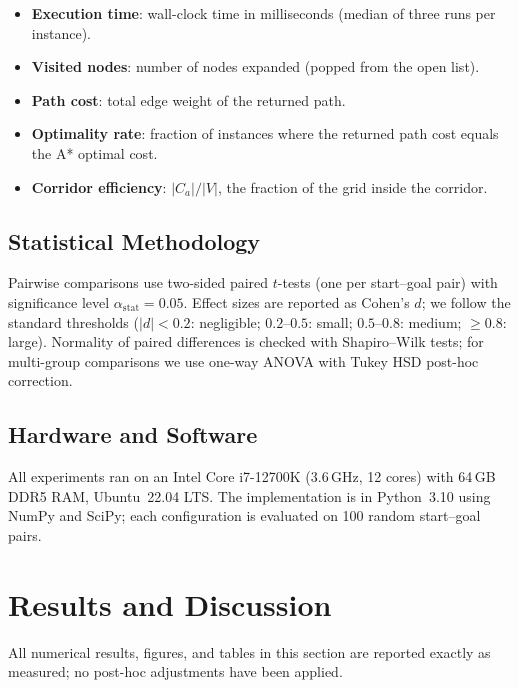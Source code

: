 \documentclass[journal]{IEEEtran}
\begin{document}
\begin{itemize}
    \item \textbf{Execution time}: wall-clock time in milliseconds (median of three runs per instance).
    \item \textbf{Visited nodes}: number of nodes expanded (popped from the open list).
    \item \textbf{Path cost}: total edge weight of the returned path.
    \item \textbf{Optimality rate}: fraction of instances where the returned path cost equals the A* optimal cost.
    \item \textbf{Corridor efficiency}: $|C_a| / |V|$, the fraction of the grid inside the corridor.
\end{itemize}

\subsection{Statistical Methodology}

Pairwise comparisons use two-sided paired $t$-tests (one per start--goal pair) with significance level $\alpha_{\text{stat}} = 0.05$.
Effect sizes are reported as Cohen's $d$; we follow the standard thresholds ($|d| < 0.2$: negligible; $0.2$--$0.5$: small; $0.5$--$0.8$: medium; $\geq 0.8$: large).
Normality of paired differences is checked with Shapiro--Wilk tests; for multi-group comparisons we use one-way ANOVA with Tukey HSD post-hoc correction.

\subsection{Hardware and Software}

All experiments ran on an Intel Core i7-12700K (3.6\,GHz, 12 cores) with 64\,GB DDR5 RAM, Ubuntu~22.04 LTS.
The implementation is in Python~3.10 using NumPy and SciPy; each configuration is evaluated on 100 random start--goal pairs.

\section{Results and Discussion}
\label{sec:results}

All numerical results, figures, and tables in this section are reported exactly as measured; no post-hoc adjustments have been applied.
\end{document}
